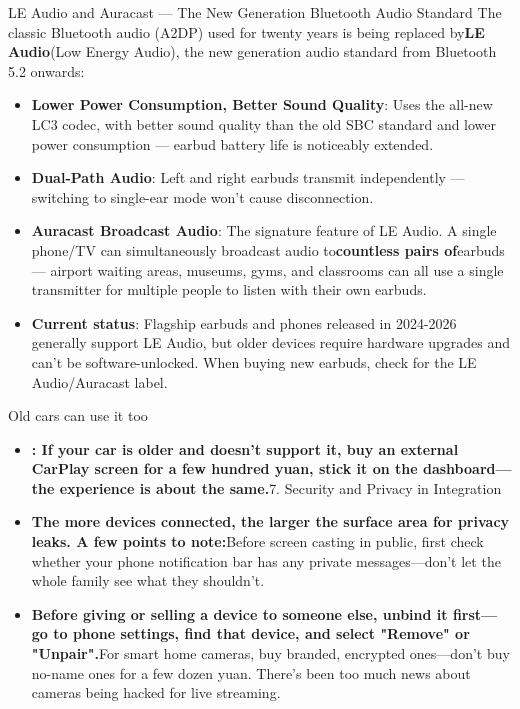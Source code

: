 \begin{tcbinfo}{LE Audio and Auracast — The New Generation Bluetooth Audio Standard}
The classic Bluetooth audio (A2DP) used for twenty years is being replaced by\textbf{LE Audio}(Low Energy Audio), the new generation audio standard from Bluetooth 5.2 onwards:

\begin{itemize}
  \item \textbf{Lower Power Consumption, Better Sound Quality}: Uses the all-new LC3 codec, with better sound quality than the old SBC standard and lower power consumption — earbud battery life is noticeably extended.
  \item \textbf{Dual-Path Audio}: Left and right earbuds transmit independently — switching to single-ear mode won't cause disconnection.
  \item \textbf{Auracast Broadcast Audio}: The signature feature of LE Audio. A single phone/TV can simultaneously broadcast audio to\textbf{countless pairs of}earbuds — airport waiting areas, museums, gyms, and classrooms can all use a single transmitter for multiple people to listen with their own earbuds.
  \item \textbf{Current status}: Flagship earbuds and phones released in 2024-2026 generally support LE Audio, but older devices require hardware upgrades and can't be software-unlocked. When buying new earbuds, check for the LE Audio/Auracast label.
\end{itemize}

\end{tcbinfo}


Old cars can use it too

\begin{itemize}
  \item \textbf{: If your car is older and doesn't support it, buy an external CarPlay screen for a few hundred yuan, stick it on the dashboard—the experience is about the same.}7. Security and Privacy in Integration
  \item \textbf{The more devices connected, the larger the surface area for privacy leaks. A few points to note:}Before screen casting in public, first check whether your phone notification bar has any private messages—don't let the whole family see what they shouldn't.
  \item \textbf{Before giving or selling a device to someone else, unbind it first—go to phone settings, find that device, and select "Remove" or "Unpair".}For smart home cameras, buy branded, encrypted ones—don't buy no-name ones for a few dozen yuan. There's been too much news about cameras being hacked for live streaming.
\end{itemize}

